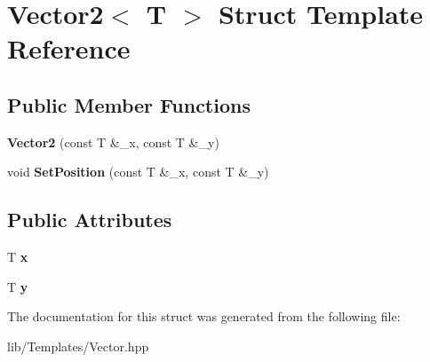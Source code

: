 \hypertarget{struct_vector2}{}\section{Vector2$<$ T $>$ Struct Template Reference}
\label{struct_vector2}
\subsection*{Public Member Functions}
\begin{DoxyCompactItemize}
\item 
\mbox{\label{struct_vector2_ab8cf9f67f03bae6dbc56de251fcbee28}} 
{\bfseries Vector2} (const T \&\+\_\+x, const T \&\+\_\+y)
\item 
\mbox{\label{struct_vector2_a14813c3593ca20eb25c5d7cc1ad6daa4}} 
void {\bfseries Set\+Position} (const T \&\+\_\+x, const T \&\+\_\+y)
\end{DoxyCompactItemize}
\subsection*{Public Attributes}
\begin{DoxyCompactItemize}
\item 
\mbox{\label{struct_vector2_a78fa1f2ed5e261c7fbeb8f3536a1ee34}} 
T {\bfseries x}
\item 
\mbox{\label{struct_vector2_a6cfed8355591aa269f4dba43bd806ef9}} 
T {\bfseries y}
\end{DoxyCompactItemize}


The documentation for this struct was generated from the following file\+:\begin{DoxyCompactItemize}
\item 
lib/\+Templates/Vector.\+hpp\end{DoxyCompactItemize}
